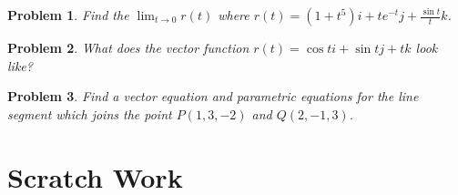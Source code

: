 \documentclass[11pt]{article}
\newtheorem{problem}{Problem}
\begin{document}
\vspace{8.5cm}

\begin{problem}
    Find the $\lim_{t \to 0}r(t)$ where $r(t) = (1+t^5)i+te^{-t}j+\frac{\sin{t}}{t}k$.
\end{problem}

\vspace{8.5cm}

\begin{problem}
    What does the vector function $r(t) = \cos{t}i+\sin{t}j+tk$ look like?
\end{problem}


\vspace{8.5cm}

\begin{problem}
    Find a vector equation and parametric equations for the line segment which joins the point $P(1,3,-2)$ and $Q(2,-1,3)$.
\end{problem}

\newpage

\section{Scratch Work}
\end{document}
